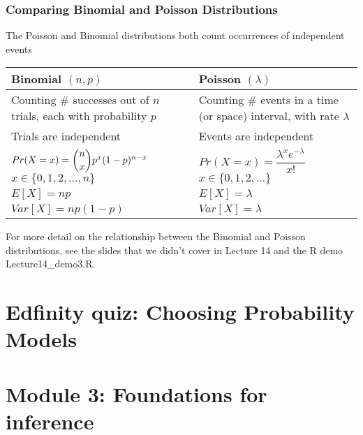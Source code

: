 \documentclass[t,compress,mathserif]{beamer}
\begin{document}
\begin{frame}
\frametitle{Comparing Binomial and Poisson Distributions}

The Poisson and Binomial distributions both count occurrences of independent events

\vspace{0.3cm}

\begin{tabular}{|p{}|p{}|}
\hline
\rowcolor{gray!20}
\textbf{Binomial $(n, p)$} & \textbf{Poisson $(\lambda)$} \\
\hline
Counting \# successes out of $n$ trials, each with probability $p$ & Counting \# events in a time (or space) interval, with rate $\lambda$ \\
\hline
Trials are independent & Events are independent \\
\hline
$Pr(X = x) = \dbinom{n}{x} p^x (1-p)^{n-x}$ \newline $x \in \{0,1,2,\ldots,n\}$ & $Pr(X = x) = \dfrac{\lambda^x e^{-\lambda}}{x!}$ \newline $x \in \{0,1,2,\ldots\}$ \\
\hline
$E[X] = np$ & $E[X] = \lambda$ \\
\hline
$Var[X] = np(1-p)$ & $Var[X] = \lambda$ \\
\hline
\end{tabular}

\small{For more detail on the relationship between the Binomial and Poisson distributions, see the slides that we didn't cover in Lecture 14 and the R demo Lecture14\_demo3.R.}

\end{frame}


\section{Edfinity quiz: Choosing Probability Models}


\section{Module 3: Foundations for inference}

\end{document}
